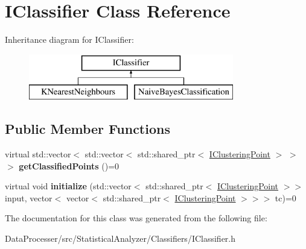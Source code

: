 \hypertarget{classIClassifier}{}\section{I\+Classifier Class Reference}
\label{classIClassifier}
Inheritance diagram for I\+Classifier\+:\begin{figure}[H]
\begin{center}
\leavevmode
\includegraphics[height=2.000000cm]{classIClassifier}
\end{center}
\end{figure}
\subsection*{Public Member Functions}
\begin{DoxyCompactItemize}
\item 
\mbox{\label{classIClassifier_ae16ef894fd72f4d94986f6d68a9d43c5}} 
virtual std\+::vector$<$ std\+::vector$<$ std\+::shared\+\_\+ptr$<$ \hyperlink{classIClusteringPoint}{I\+Clustering\+Point} $>$ $>$ $>$ {\bfseries get\+Classified\+Points} ()=0
\item 
\mbox{\label{classIClassifier_ab0033ae8e780d741ff1d70c4473ee385}} 
virtual void {\bfseries initialize} (std\+::vector$<$ std\+::shared\+\_\+ptr$<$ \hyperlink{classIClusteringPoint}{I\+Clustering\+Point} $>$$>$ input, vector$<$ vector$<$ std\+::shared\+\_\+ptr$<$ \hyperlink{classIClusteringPoint}{I\+Clustering\+Point} $>$$>$$>$ tc)=0
\end{DoxyCompactItemize}


The documentation for this class was generated from the following file\+:\begin{DoxyCompactItemize}
\item 
Data\+Processer/src/\+Statistical\+Analyzer/\+Classifiers/I\+Classifier.\+h\end{DoxyCompactItemize}
